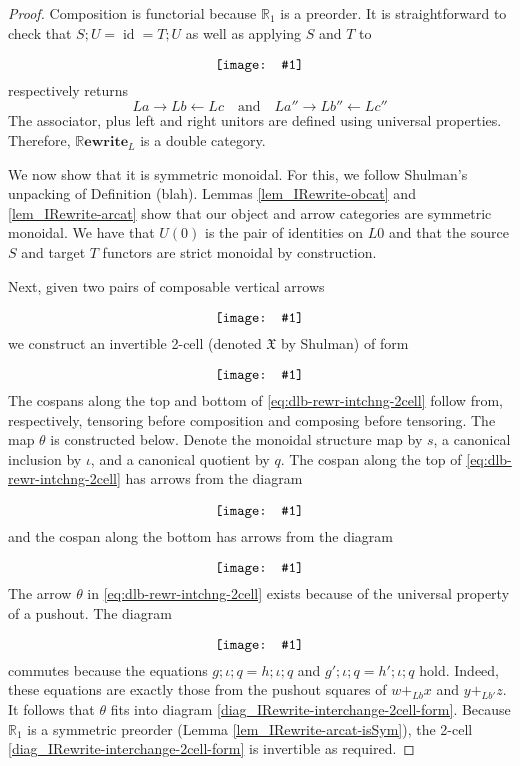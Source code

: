 \documentclass[]{amsart}
\newcommand{\RR}{\mathbb{R}}
\newcommand{\diagram}[1]{\raisebox{-0.5\height}{\texttt{[image: \#1]}}}
\newcommand{\RRewrite}{ \mathbb{R}\mathbf{ewrite} }
\newcommand{\edit}[1]{\textcolor{editcolour}{(#1)}}
\DeclareMathOperator{\id}{id}
\theoremstyle{remark}
\theoremstyle{definition}
\begin{document}
\begin{proof}
  
  Composition is functorial because $ \RR_1 $ is a preorder. It is
  straightforward to check that $ S;U = \id = T;U$ as well as applying
  $ S $ and $ T $ to
  \[
    \diagram{diag_nlr_dbl-rewrite-deconstructed-composite}
  \]
  respectively returns
  \[
    La \to Lb \gets Lc \quad \text{and} \quad La'' \to Lb'' \gets Lc''
  \]
  The associator, plus left and right unitors are defined using
  universal properties. Therefore, $ \RRewrite_L $ is a double
  category.
	
  We now show that it is symmetric monoidal.  For this, we follow
  Shulman's unpacking of Definition \edit{blah}.  
  Lemmas \ref{lem_IRewrite-obcat} and \ref{lem_IRewrite-arcat} show
  that our object and arrow categories are symmetric monoidal.  We
  have that $ U ( 0 ) $ is the pair of identities on $ L 0 $ and that
  the source $ S $ and target $ T $ functors are strict monoidal by
  construction.
	
  Next, given two pairs of composable vertical arrows
  \[
    \diagram{diag_nlr_dbl-rewrite-interchange}
  \]
  we construct an invertible 2-cell (denoted $ \mathfrak{X} $ by
  Shulman) of form
  \begin{equation}\label{eq:dlb-rewr-intchng-2cell}
    \diagram{diag_nlr_dbl-rewrite-interchange-2cell}
  \end{equation}
  The cospans along the top and bottom of
  \eqref{eq:dlb-rewr-intchng-2cell} follow from, respectively,
  tensoring before composition and composing before tensoring. The map
  $ \theta $ is constructed below. Denote the monoidal structure map
  by $ s $, a canonical inclusion by $ \iota $, and a canonical
  quotient by $ q $.  The cospan along the top of
  \eqref{eq:dlb-rewr-intchng-2cell} has arrows from the diagram
  \[
    \diagram{diag_nlr_dbl-rewrite-tensor-compose}
  \]
  and the cospan along the bottom has arrows from the diagram
  \[
    \diagram{diag_nlr_dbl-rewrite-compose-tensor}
  \]
  The arrow $ \theta $ in \eqref{eq:dlb-rewr-intchng-2cell} exists
  because of the universal property of a pushout.  The diagram
  \[
    \diagram{diag_nlr_dbl-rewrite-pushout-competetor}
  \]
  commutes because the equations $ g ; \iota ; q = h ; \iota ; q $ and
  $ g' ; \iota ; q = h' ; \iota ; q $ hold.  Indeed, these equations
  are exactly those from the pushout squares of $ w +_{Lb} x $ and
  $ y +_{Lb'} z $.  It follows that $ \theta $ fits into diagram
  \eqref{diag_IRewrite-interchange-2cell-form}. Because $ \RR_1 $ is a
  symmetric preorder (Lemma \ref{lem_IRewrite-arcat-isSym}), the
  2-cell \eqref{diag_IRewrite-interchange-2cell-form} is invertible as
  required.
	

\end{proof}
\end{document}
